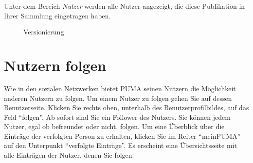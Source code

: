 Unter dem Bereich \textit{Nutzer} werden alle Nutzer angezeigt, die diese Publikation in Ihrer Sammlung eingetragen haben.
\begin{figure}[h!]
 \centering
 \caption{Versionierung}
 \label{figure065}
\end{figure}
\section{Nutzern folgen}
Wie in den sozialen Netzwerken bietet PUMA seinen Nutzern die Möglichkeit anderen Nutzern zu folgen. \newline
Um einem Nutzer zu folgen gehen Sie auf dessen Benutzerseite. Klicken Sie rechts oben, unterhalb des Benutzerprofilbildes, auf das Feld \enquote{folgen}. Ab sofort sind Sie ein Follower des Nutzers. Sie können jedem Nutzer, egal ob befreundet oder nicht, folgen. \newline \newline
Um eine Überblick über die Einträge der verfolgten Person zu erhalten, klicken Sie im Reiter \enquote{meinPUMA} auf den Unterpunkt \enquote{verfolgte Einträge}. Es erscheint eine Übersichtsseite mit alle Einträgen der Nutzer, denen Sie folgen. 





